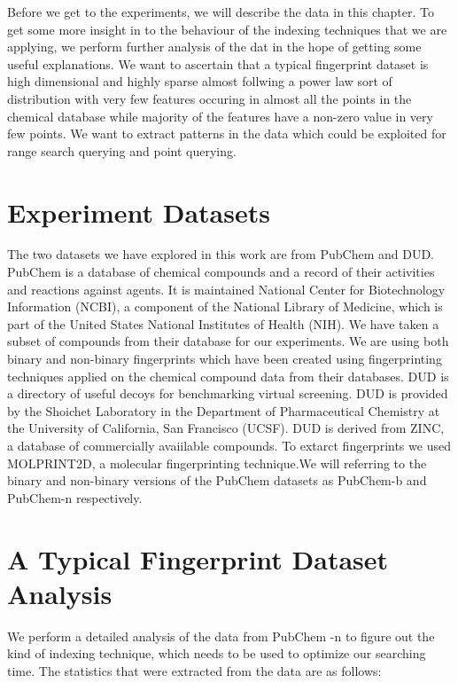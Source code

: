 Before we get to the experiments, we will describe the data in this chapter. To get some more insight in to the behaviour of the indexing techniques that we are applying, we perform further analysis of the dat in the hope of getting some useful explanations. We want to ascertain that a typical fingerprint dataset is high dimensional and highly sparse almost follwing a power law sort of distribution with very few features occuring in almost all the points in the chemical database while majority of the features have a non-zero value in very few points. We want to extract patterns in the data which could be exploited for range search querying and point querying.\\

\section{Experiment Datasets}

The two datasets we have explored in this work are from PubChem and DUD. PubChem is a database of chemical compounds and a record of their activities and reactions against agents. It is maintained National Center for Biotechnology Information (NCBI), a component of the National Library of Medicine, which is part of the United States National Institutes of Health (NIH). We have taken a subset of compounds from their database for our experiments. We are using both binary and non-binary fingerprints which have been created using fingerprinting techniques applied on the chemical compound data from their databases. DUD is a directory of useful decoys for benchmarking virtual screening. DUD is provided by the Shoichet Laboratory in the Department of Pharmaceutical Chemistry at the University of California, San Francisco (UCSF). DUD is derived from ZINC, a database of commercially avaiilable compounds. To extarct fingerprints we used MOLPRINT2D, a molecular fingerprinting technique.We will referring to the binary and non-binary versions of the PubChem datasets as PubChem-b and PubChem-n respectively.


\section{A Typical Fingerprint Dataset Analysis}
We perform a detailed analysis of the data from  PubChem -n to figure out the kind of indexing technique, which needs to be used to optimize our searching time. The statistics that were extracted from the data are as follows:\\

